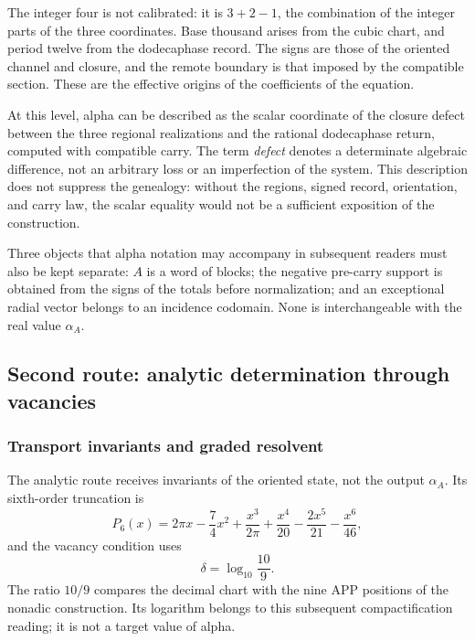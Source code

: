The integer four is not calibrated: it is
\(3+2-1\), the combination of the integer parts of the three coordinates.
Base thousand arises from the cubic chart, and period twelve from the dodecaphase record.
The signs are those of the oriented channel and closure, and the remote boundary is
that imposed by the compatible section. These are the effective origins of
the coefficients of the equation.

At this level, alpha can be described as the scalar coordinate of the
closure defect between the three regional realizations and the
rational dodecaphase return, computed with compatible carry. The term
\emph{defect} denotes a determinate algebraic difference, not an
arbitrary loss or an imperfection of the system. This description does not
suppress the genealogy: without the regions, signed record,
orientation, and carry law, the scalar equality would not be a
sufficient exposition of the construction.

Three objects that alpha notation may accompany in subsequent readers
must also be kept separate: \(A\) is a word of
blocks; the negative pre-carry support is obtained from the signs of the
totals before normalization; and an exceptional radial vector belongs to
an incidence codomain. None is interchangeable with the
real value \(\alpha_A\).






\subsection{Second route: analytic determination through vacancies}
\subsubsection{Transport invariants and graded resolvent}
\label{subsec:alpha-via-b}

The analytic route receives invariants of the oriented state, not the output
\(\alpha_A\). Its sixth-order truncation is
\begin{equation}
 P_6(x)=2\pi x-\frac74x^2
 +\frac{x^3}{2\pi}
 +\frac{x^4}{20}-\frac{2x^5}{21}-\frac{x^6}{46},
 \label{eq:alpha-p6}
\end{equation}
and the vacancy condition uses
\[
 \delta=\log_{10}\frac{10}{9}.
\]
The ratio \(10/9\) compares the decimal chart with the nine APP
positions of the nonadic construction. Its logarithm belongs to this subsequent
compactification reading; it is not a target value of alpha.

